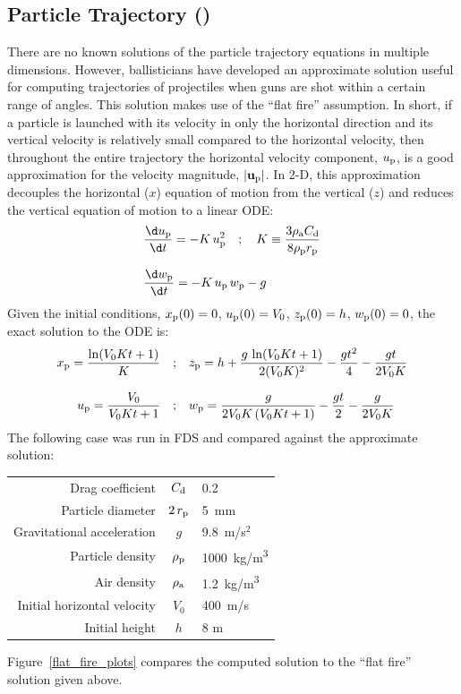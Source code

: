 \documentclass[11pt]{book}
\begin{document}
\subsection{Particle Trajectory (\texorpdfstring{}{flat\_fire})}
\label{flat_fire}

There are no known solutions of the particle trajectory equations in multiple dimensions. However, ballisticians have developed an approximate solution useful for computing trajectories of projectiles when guns are shot within a certain range of angles. This solution makes use of the ``flat fire'' assumption. In short, if a particle is launched with its velocity in only the horizontal direction and its vertical velocity is relatively small compared to the horizontal velocity, then throughout the entire trajectory the horizontal velocity component, $u_{\rm p}$, is a good approximation for the velocity magnitude, $|\mathbf{u_{\rm p}}|$. In 2-D, this approximation decouples the horizontal ($x$) equation of motion from the vertical ($z$) and reduces the vertical equation of motion to a linear ODE:
\begin{align}
   &\frac{\d u_{\rm p}}{\d t} = -K \, u_{\rm p}^2 \quad ;  \quad K \equiv \frac{3 \rho_{\rm a} C_{\rm d}}{8 \rho_{\rm p} r_{\rm p}} \\[.1in]
   &\frac{\d w_{\rm p}}{\d t} = -K \, u_{\rm p} \, w_{\rm p} - g
\end{align}
Given the initial conditions, $x_{\rm p}(0) = 0$, $u_{\rm p}(0) = V_0$, $z_{\rm p}(0) = h$, $w_{\rm p}(0) = 0$, the exact solution to the ODE is:
\begin{align}
    x_{\rm p} = \frac{\ln(V_0 K t + 1)}{K} \quad ;& \quad
    z_{\rm p} = h + \frac{g \, \ln(V_0 K t + 1)}{2 (V_0 K)^2} - \frac{g t^2}{4} - \frac{g t}{2 V_0 K} \\[.1in]
    u_{\rm p} = \frac{V_0}{V_0 K t + 1} \quad ;& \quad w_{\rm p} = \frac{g}{2 V_0 K \, (V_0 K t + 1)} - \frac{g t}{2} - \frac{g}{2 V_0 K}
\end{align}
The following case was run in FDS and compared against the approximate solution:
\begin{center}
\begin{tabular}{|r|c|l|}
\hline
Drag coefficient                  & $C_{\rm d}$          & 0.2 \\
Particle diameter                 & $2\, r_{\rm p}$      & 5~mm \\
Gravitational acceleration        & $g$                  & 9.8~m/s$^2$ \\
Particle density                  & $\rho_{\rm p}$       & 1000~\si{kg/m^3} \\
Air density                       & $\rho_{\rm a}$       & 1.2~\si{kg/m^3} \\
Initial horizontal velocity       & $V_0$                & 400~m/s \\
Initial height                    & $h$                  & 8 m \\
\hline
\end{tabular}
\end{center}
Figure~\ref{flat_fire_plots} compares the computed solution to the ``flat fire'' solution given above.
\end{document}
